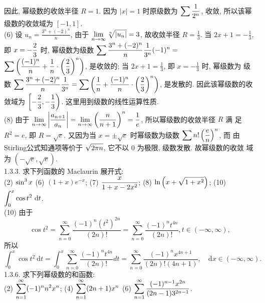\documentclass[a4paper,11pt,UTF8]{article}
\begin{document}
因此, 幂级数的收敛半径 $R=1$. 因为 $|x|=1$ 时原级数为 $\displaystyle \displaystyle \sum \frac{1}{2^n}$, 收敛, 所以该幂 级数的收敛域为 $[-1,1]$.\\
(6) 设 $u_n=\frac{3^n+(-2)^n}{n}$, 由于 $\displaystyle \displaystyle \lim _{n \rightarrow \infty} \sqrt[n]{\left|u_n\right|}=3$, 故收敛半径 $R=\frac{1}{3}$. 当 $2 x+1=-\frac{1}{3}$, 即 $\displaystyle \displaystyle x=-\frac{2}{3}$ 时, 幂级数为级数 $\displaystyle \displaystyle \sum \frac{3^n+(-2)^n}{n} \frac{1}{3^n}(-1)^n=$ $\displaystyle \displaystyle \sum\left(\frac{(-1)^n}{n}+\frac{1}{n} \cdot\left(\frac{2}{3}\right)^n\right)$, 是收敛的; 当 $2 x+1=\frac{1}{3}$, 即 $x=-\frac{1}{3}$ 时, 幂级数为 级数 $\displaystyle \displaystyle \sum \frac{3^n+(-2)^n}{n} \frac{1}{3^n}=\sum\left(\frac{1}{n}+\frac{(-1)^n}{n} \cdot\left(\frac{2}{3}\right)^n\right)$, 是发散的. 因此该幂级数的收 敛域为 $\displaystyle \displaystyle \left[-\frac{2}{3},-\frac{1}{3}\right)$. 这里用到级数的线性运算性质.\\
(8) 由于 $\displaystyle \displaystyle \lim _{n \rightarrow \infty}\left|\frac{a_{n+1}}{a_n}\right|=\lim _{n \rightarrow \infty}\left(\frac{n}{n+1}\right)^n=\frac{1}{e}$, 所以幂级数的收敛半径 $R$ 满 足 $R^2=e$, 即 $R=\sqrt{e}$. 又因为当 $x= \pm \sqrt{e}$ 时幂级数为级数 $\displaystyle \displaystyle \sum n !\left(\frac{e}{n}\right)^n$, 而 由Stirling公式知通项等价于 $\displaystyle \displaystyle \sqrt{2 \pi n}$, 它不以 0 为极限, 级数发散. 故幂级数的收敛 域为 $(-\sqrt{e}, \sqrt{e})$.\\
1.3.3. 求下列函数的 Maclaurin 展开式:\\
(2) $\displaystyle \displaystyle \sin ^3 x$
(6) $(1+x) e^{-x}$;
(7) $\displaystyle \displaystyle \frac{x}{1+x-2 x^2}$;
(8) $\displaystyle \displaystyle \ln \left(x+\sqrt{1+x^2}\right)$;
(10) $\displaystyle \displaystyle \int_0^x \cos t^2 \mathrm{~d} t$.\\
(10) 由于
$$
\cos t^2=\sum_{n=0}^{\infty} \frac{(-1)^n\left(t^2\right)^{2 n}}{(2 n) !}=\sum_{n=0}^{\infty} \frac{(-1)^n t^{4 n}}{(2 n) !}, t \in(-\infty, \infty),
$$
所以
$$
\int_0^x \cos t^2 \mathrm{~d} t=\int_0^x \sum_{n=0}^{\infty} \frac{(-1)^n t^{4 n}}{(2 n) !} d t=\sum_{n=0}^{\infty} \frac{(-1)^n x^{4 n+1}}{(2 n) !(4 n+1)}, \quad\mathrm{d}x \in(-\infty, \infty) .
$$
1.3.6. 求下列幂级数的和函数:\\
(2) $\displaystyle \displaystyle \sum_{n=1}^{\infty}(-1)^n n^2 x^n$;
(4) $\displaystyle \displaystyle \sum_{n=1}^{\infty}(2 n+1) x^n$
(6) $\displaystyle \displaystyle \sum_{n=1}^{\infty} \frac{(-1)^{n-1} x^{2 n}}{(2 n-1) 3^{2 n-1}}$.\\
\end{document}
